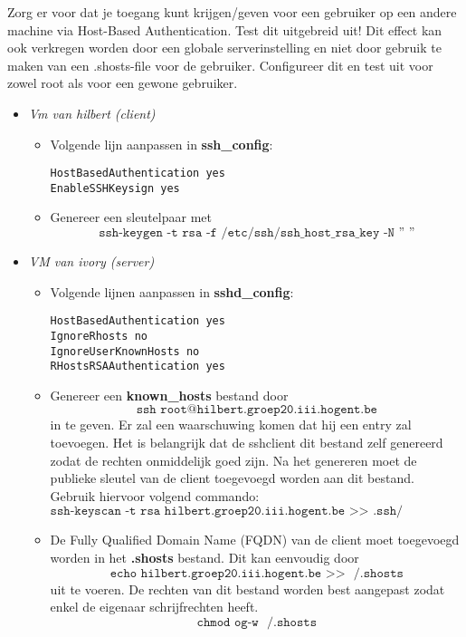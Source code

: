 \documentclass{report}
\begin{document}
Zorg er voor dat je toegang kunt krijgen/geven voor een gebruiker op een andere machine via Host-Based Authentication.
Test dit uitgebreid uit! Dit effect kan ook verkregen worden door een globale serverinstelling en niet door gebruik te maken van een .shosts-file voor de gebruiker. Configureer dit en test uit voor zowel root als voor een gewone gebruiker. 
\begin{itemize}
	\item \textit{Vm van hilbert (client)}
		\begin{itemize}

			\item Volgende lijn aanpassen in \textbf{ssh\_config}:
			\begin{lstlisting}
HostBasedAuthentication yes
EnableSSHKeysign yes
			\end{lstlisting}
			\item Genereer een sleutelpaar met 
			$$\texttt{ssh-keygen -t rsa -f /etc/ssh/ssh\_host\_rsa\_key -N '' ''}$$
		\end{itemize}
	\item \textit{VM van ivory (server)}
		  \begin{itemize}
		  	\item Volgende lijnen aanpassen in \textbf{sshd\_config}:
		  		\begin{lstlisting}
HostBasedAuthentication yes
IgnoreRhosts no
IgnoreUserKnownHosts no
RHostsRSAAuthentication yes
		  		\end{lstlisting}
		  	\item Genereer een \textbf{known\_hosts} bestand door 
		  		$$\texttt{ssh root@hilbert.groep20.iii.hogent.be}$$
		  		in te geven. Er zal een waarschuwing komen dat hij een entry zal toevoegen. Het is belangrijk dat de sshclient dit bestand zelf genereerd zodat de rechten onmiddelijk goed zijn. Na het genereren moet de publieke sleutel van de client toegevoegd worden aan dit bestand. Gebruik hiervoor volgend commando:
		  		$$\texttt{ssh-keyscan -t rsa hilbert.groep20.iii.hogent.be >> .ssh/known\_hosts}$$
		  		
		  	\item De Fully Qualified Domain Name (FQDN) van de client moet toegevoegd worden in het \textbf{.shosts} bestand. Dit kan eenvoudig door 
		  	$$\texttt{echo hilbert.groep20.iii.hogent.be >> ~/.shosts}$$
		  	uit te voeren. De rechten van dit  bestand worden best aangepast zodat enkel de eigenaar schrijfrechten heeft. 
		  	$$\texttt{chmod og-w ~/.shosts}$$
		  \end{itemize}

\end{itemize}
\end{document}
